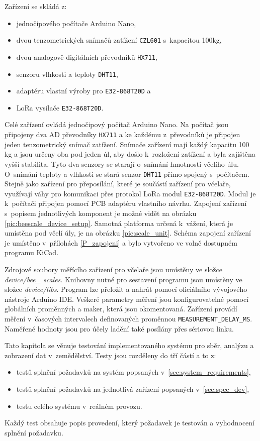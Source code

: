 Zařízení se skládá z:
\begin{itemize}
    \item jednočipového počítače Arduino Nano,
    \item dvou tenzometrických snímačů zatížení \texttt{CZL601} s~kapacitou 100kg,
    \item dvou analogově-digitálních převodníků \texttt{HX711},
    \item senzoru vlhkosti a teploty \texttt{DHT11},
    \item adaptéru vlastní výroby pro \texttt{E32-868T20D} a
    \item LoRa vysílače \texttt{E32-868T20D}.
\end{itemize}
Celé zařízení ovládá jednočipový počítač Arduino Nano. Na počítač jsou připojeny dva AD převodníky \texttt{HX711} a ke každému z~převodníků je připojen jeden tenzometrický snímač zatížení. Snímače zařízení mají každý kapacitu 100 kg a jsou určeny oba pod jeden úl, aby došlo k~rozložení zatížení a byla zajištěna vyšší stabilita. Tyto dva senzory se starají o~snímání hmotnosti včelího úlu. O~snímání teploty a vlhkosti se stará senzor \texttt{DHT11} přímo spojený s~počítačem. Stejně jako zařízení pro přeposílání, které je součástí zařízení pro včelaře, využívají váhy pro komunikaci přes protokol LoRa modul \texttt{E32-868T20D}. Modul je k~počítači připojen pomocí PCB adaptéru vlastního návrhu. Zapojení zařízení s~popisem jednotlivých komponent je možné vidět na obrázku \ref{pic:beescale_device_setup}. Samotná platforma určená k~vážení, která je umístěna pod včelí úly, je na obrázku \ref{pic:scale_unit}. Schéma zapojení zařízení je umístěno v~přílohách \ref{P_zapojeni} a bylo vytvořeno ve volně dostupném programu KiCad.

Zdrojové soubory měřícího zařízení pro včelaře jsou umístěny ve složce \textit{device/bee\_ scales}. Knihovny nutné pro sestavení programu jsou umístěny ve složce \textit{device/libs}. Program lze přeložit a nahrát pomocí oficiálního vývojového nástroje Arduino IDE. Veškeré parametry měření jsou konfigurovatelné pomocí globálních proměnných a maker, která jsou okomentovaná. Zařízení provádí měření v~časových intervalech definovaných proměnnou \texttt{MEASUREMENT\_DELAY\_MS}. Naměřené hodnoty jsou pro účely ladění také posílány přes sériovou linku. 




\label{sec:testing}
Tato kapitola se věnuje testování implementovaného systému pro sběr, analýzu a zobrazení dat v~zemědělství. Testy jsou rozděleny do tří částí a to z:
\begin{itemize}
    \item testů splnění požadavků na systém popsaných v~\ref{sec:system_requirements},
    \item testů splnění požadavků na jednotlivá zařízení popsaných v~\ref{sec:spec_dev},
    \item testu celého systému v~reálném provozu.
\end{itemize}
Každý test obsahuje popis provedení, který požadavek je testován a vyhodnocení splnění požadavku.



